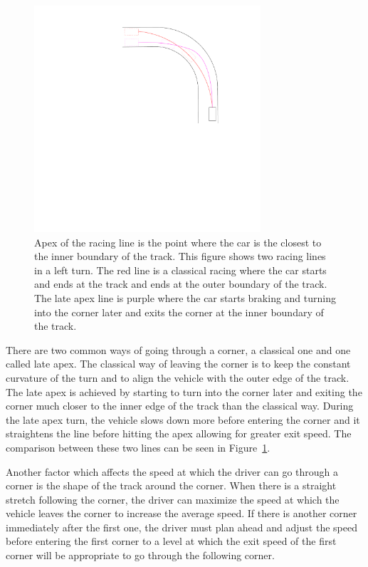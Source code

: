 \begin{figure}
	\centering
	\label{fig:apex}
	\includegraphics[trim=360 450 20 0, clip, width=0.75\textwidth]{../img/apex}
	\caption{Apex of the racing line is the point where the car is the closest to the inner boundary of the track. This figure shows two racing lines in a left turn. The red line is a classical racing where the car starts and ends at the track and ends at the outer boundary of the track. The late apex line is purple where the car starts braking and turning into the corner later and exits the corner at the inner boundary of the track.}
\end{figure}

There are two common ways of going through a corner, a classical one and one called late apex. The classical way of leaving the corner is to keep the constant curvature of the turn and to align the vehicle with the outer edge of the track. The late apex is achieved by starting to turn into the corner later and exiting the corner much closer to the inner edge of the track than the classical way. During the late apex turn, the vehicle slows down more before entering the corner and it straightens the line before hitting the apex allowing for greater exit speed. The comparison between these two lines can be seen in Figure~\ref{fig:apex}.

Another factor which affects the speed at which the driver can go through a corner is the shape of the track around the corner. When there is a straight stretch following the corner, the driver can maximize the speed at which the vehicle leaves the corner to increase the average speed. If there is another corner immediately after the first one, the driver must plan ahead and adjust the speed before entering the first corner to a level at which the exit speed of the first corner will be appropriate to go through the following corner.

